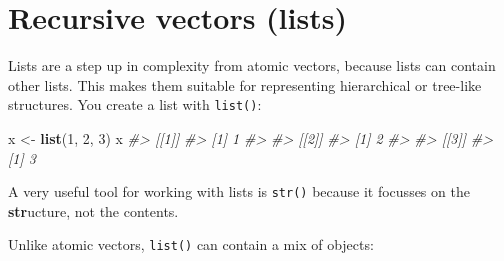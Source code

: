 \documentclass[]{book}
\newenvironment{Shaded}{\begin{snugshade}}{\end{snugshade}}
\newcommand{\KeywordTok}[1]{\textcolor[rgb]{0.13,0.29,0.53}{\textbf{{#1}}}}
\newcommand{\DataTypeTok}[1]{\textcolor[rgb]{0.13,0.29,0.53}{{#1}}}
\newcommand{\DecValTok}[1]{\textcolor[rgb]{0.00,0.00,0.81}{{#1}}}
\newcommand{\FloatTok}[1]{\textcolor[rgb]{0.00,0.00,0.81}{{#1}}}
\newcommand{\StringTok}[1]{\textcolor[rgb]{0.31,0.60,0.02}{{#1}}}
\newcommand{\CommentTok}[1]{\textcolor[rgb]{0.56,0.35,0.01}{\textit{{#1}}}}
\newcommand{\OtherTok}[1]{\textcolor[rgb]{0.56,0.35,0.01}{{#1}}}
\newcommand{\NormalTok}[1]{{#1}}
\begin{document}
\hypertarget{lists}{\section{Recursive vectors (lists)}\label{lists}}

Lists are a step up in complexity from atomic vectors, because lists can
contain other lists. This makes them suitable for representing
hierarchical or tree-like structures. You create a list with
\texttt{list()}:

\begin{Shaded}
\begin{Highlighting}[]
\NormalTok{x <-}\StringTok{ }\KeywordTok{list}\NormalTok{(}\DecValTok{1}\NormalTok{, }\DecValTok{2}\NormalTok{, }\DecValTok{3}\NormalTok{)}
\NormalTok{x}
\CommentTok{#> [[1]]}
\CommentTok{#> [1] 1}
\CommentTok{#> }
\CommentTok{#> [[2]]}
\CommentTok{#> [1] 2}
\CommentTok{#> }
\CommentTok{#> [[3]]}
\CommentTok{#> [1] 3}
\end{Highlighting}
\end{Shaded}

A very useful tool for working with lists is \texttt{str()} because it
focusses on the \textbf{str}ucture, not the contents.

\begin{Shaded}
\end{Shaded}

Unlike atomic vectors, \texttt{list()} can contain a mix of objects:

\begin{Shaded}
\end{Shaded}
\end{document}
